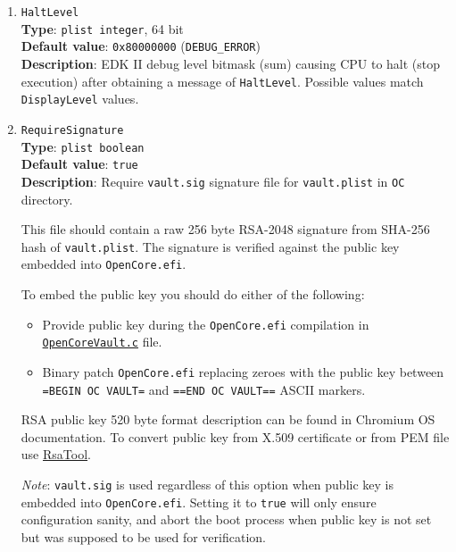 \documentclass[]{article}
\providecommand{\tightlist}{%
  \setlength{\itemsep}{0pt}\setlength{\parskip}{0pt}}
\begin{document}
\begin{enumerate}
\item
  \texttt{HaltLevel}\\
  \textbf{Type}: \texttt{plist\ integer}, 64 bit\\
  \textbf{Default value}: \texttt{0x80000000} (\texttt{DEBUG\_ERROR})\\
  \textbf{Description}: EDK II debug level bitmask (sum) causing CPU to
  halt (stop execution) after obtaining a message of \texttt{HaltLevel}.
  Possible values match \texttt{DisplayLevel} values.

\item
  \texttt{RequireSignature}\\
  \textbf{Type}: \texttt{plist\ boolean}\\
  \textbf{Default value}: \texttt{true}\\
  \textbf{Description}: Require \texttt{vault.sig} signature file for
  \texttt{vault.plist} in \texttt{OC} directory.

  This file should contain a raw 256 byte RSA-2048 signature from SHA-256
  hash of \texttt{vault.plist}. The signature is verified against the public
  key embedded into \texttt{OpenCore.efi}.

  To embed the public key you should do either of the following:

  \begin{itemize}
  \tightlist
  \item Provide public key during the \texttt{OpenCore.efi} compilation in
  \href{https://github.com/acidanthera/OpenCorePkg/blob/master/Platform/OpenCore/OpenCoreVault.c}{\texttt{OpenCoreVault.c}} file.
  \item Binary patch \texttt{OpenCore.efi} replacing zeroes with the public key
  between \texttt{=BEGIN OC VAULT=} and \texttt{==END OC VAULT==} ASCII markers.
  \end{itemize}

  RSA public key 520 byte format description can be found in Chromium OS documentation.
  To convert public key from X.509 certificate or from PEM file use
  \href{https://github.com/acidanthera/OcSupportPkg/tree/master/Tools/RsaTool}{RsaTool}.

  \emph{Note}: \texttt{vault.sig} is used regardless of this option when public key
  is embedded into \texttt{OpenCore.efi}. Setting it to \texttt{true} will only ensure
  configuration sanity, and abort the boot process when public key is not set but
  was supposed to be used for verification.


\end{enumerate}
\end{document}
